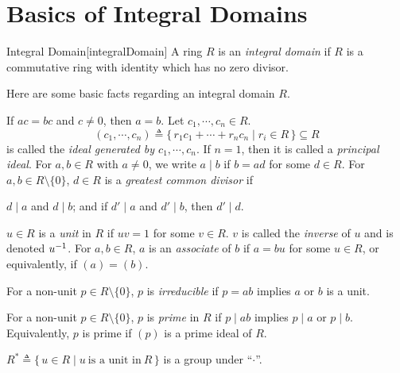 \documentclass[../modern_algebra_2.tex]{subfiles}
\begin{document}
\section{Basics of Integral Domains}

\begin{Definition}{Integral Domain}[integralDomain]
    A ring \(R\) is an \emph{integral domain} if
    \(R\) is a commutative ring with identity which has no zero divisor.
\end{Definition}

\begin{note}
    Here are some basic facts regarding an integral domain \(R\).
    \begin{enumerate}[label=(\arabic*)]
        \ii If \(ac = bc\) and \(c \neq 0\), then \(a = b\).
        \ii
        Let \(c_1, \cdots, c_n \in R\).
        \[
            (c_1, \cdots, c_n)
            \triangleq \{\,r_1c_1 + \cdots + r_nc_n \mid r_i \in R\,\} \subseteq R
        \]
        is called the \emph{ideal generated by \(c_1, \cdots, c_n\)}.
        If \(n = 1\), then it is called a \emph{principal ideal}.
        \ii
        For \(a, b \in R\) with \(a \neq 0\),
        we write \(a \mid b\) if \(b = ad\) for some \(d \in R\).
        \ii
        For \(a, b \in R \setminus \{0\}\),
        \(d \in R\) is a \emph{greatest common divisor} if
        \begin{enumerate}[label=(\roman*)]
            \ii
            \(d \mid a\) and \(d \mid b\); and
            \ii
            if \(d' \mid a\) and \(d' \mid b\), then \(d' \mid d\).
        \end{enumerate}
        \ii
        \(u \in R\) is a \emph{unit} in \(R\)
        if \(uv = 1\) for some \(v \in R\).
        \(v\) is called the \emph{inverse} of \(u\) and is denoted \(u^{-1}\).
        \ii
        For \(a, b \in R\), \(a\) is an \emph{associate} of \(b\)
        if \(a = bu\) for some \(u \in R\),
        or equivalently, if \((a) = (b)\).

        \ii
        For a non-unit \(p \in R \setminus \{0\}\),
        \(p\) is \emph{irreducible} if \(p = ab\) implies \(a\) or \(b\) is a unit.

        \ii
        For a non-unit \(p \in R \setminus \{0\}\),
        \(p\) is \emph{prime} in \(R\) if \(p \mid ab\) implies \(p \mid a\) or \(p \mid b\).
        Equivalently, \(p\) is prime if \((p)\) is a prime ideal of \(R\).

        \ii
        \(R^\ast \triangleq \{\,u \in R \mid u~\text{is a unit in}~R\,\}\)
        is a group under ``\(\cdot\)''.
    \end{enumerate}
\end{note}
\end{document}

